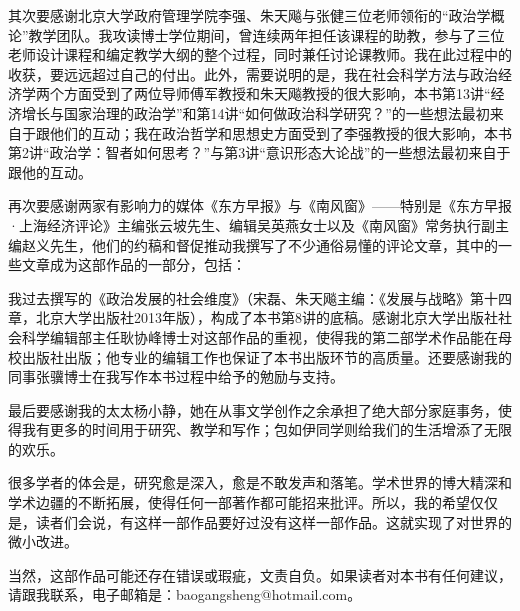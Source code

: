其次要感谢北京大学政府管理学院李强、朱天飚与张健三位老师领衔的“政治学概论”教学团队。我攻读博士学位期间，曾连续两年担任该课程的助教，参与了三位老师设计课程和编定教学大纲的整个过程，同时兼任讨论课教师。我在此过程中的收获，要远远超过自己的付出。此外，需要说明的是，我在社会科学方法与政治经济学两个方面受到了两位导师傅军教授和朱天飚教授的很大影响，本书第13讲“经济增长与国家治理的政治学”和第14讲“如何做政治科学研究？”的一些想法最初来自于跟他们的互动；我在政治哲学和思想史方面受到了李强教授的很大影响，本书第2讲“政治学：智者如何思考？”与第3讲“意识形态大论战”的一些想法最初来自于跟他的互动。

再次要感谢两家有影响力的媒体《东方早报》与《南风窗》——特别是《东方早报·上海经济评论》主编张云坡先生、编辑吴英燕女士以及《南风窗》常务执行副主编赵义先生，他们的约稿和督促推动我撰写了不少通俗易懂的评论文章，其中的一些文章成为这部作品的一部分，包括：


我过去撰写的《政治发展的社会维度》（宋磊、朱天飚主编：《发展与战略》第十四章，北京大学出版社2013年版），构成了本书第8讲的底稿。感谢北京大学出版社社会科学编辑部主任耿协峰博士对这部作品的重视，使得我的第二部学术作品能在母校出版社出版；他专业的编辑工作也保证了本书出版环节的高质量。还要感谢我的同事张骥博士在我写作本书过程中给予的勉励与支持。

最后要感谢我的太太杨小静，她在从事文学创作之余承担了绝大部分家庭事务，使得我有更多的时间用于研究、教学和写作；包如伊同学则给我们的生活增添了无限的欢乐。

很多学者的体会是，研究愈是深入，愈是不敢发声和落笔。学术世界的博大精深和学术边疆的不断拓展，使得任何一部著作都可能招来批评。所以，我的希望仅仅是，读者们会说，有这样一部作品要好过没有这样一部作品。这就实现了对世界的微小改进。

当然，这部作品可能还存在错误或瑕疵，文责自负。如果读者对本书有任何建议，请跟我联系，电子邮箱是：baogangsheng@hotmail.com。

